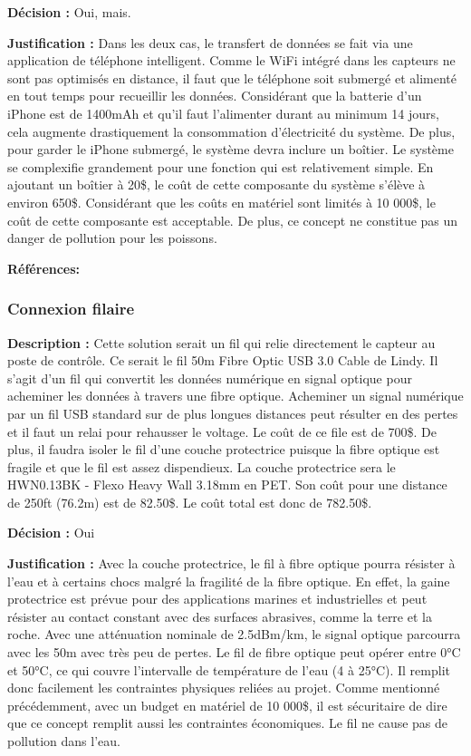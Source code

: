 \textbf{Décision :} Oui, mais.
 
\textbf{Justification :} Dans les deux cas, le transfert de données se fait via une application de téléphone intelligent. Comme le WiFi intégré dans les capteurs ne sont pas optimisés en distance, il faut que le téléphone soit submergé et alimenté en tout temps pour recueillir les données. Considérant que la batterie d'un iPhone est de 1400mAh et qu'il faut l'alimenter durant au minimum 14 jours, cela augmente drastiquement la consommation d'électricité du système. De plus, pour garder le iPhone submergé, le système devra inclure un boîtier. Le système se complexifie grandement pour une fonction qui est relativement simple. En ajoutant un boîtier à 20\$, le coût de cette composante du système s'élève à environ 650\$. Considérant que les coûts en matériel sont limités à 10 000\$, le coût de cette composante est acceptable. De plus, ce concept ne constitue pas un danger de pollution pour les poissons.

\textbf{Références:} \cite{GoPro_Specs} \cite{GoPro_Waterproof} \cite{GoFishCam} \cite{iPhone7}

\subsubsection{Connexion filaire}
\textbf{Description :} Cette solution serait un fil qui relie directement le capteur au poste de contrôle. Ce serait le fil 50m Fibre Optic USB 3.0 Cable de Lindy. Il s'agit d'un fil qui convertit les données numérique en signal optique pour acheminer les données à travers une fibre optique. Acheminer un signal numérique par un fil USB standard sur de plus longues distances peut résulter en des pertes et il faut un relai pour rehausser le voltage. Le coût de ce file est de 700\$. De plus, il faudra isoler le fil d'une couche protectrice puisque la fibre optique est fragile et que le fil est assez dispendieux. La couche protectrice sera le HWN0.13BK - Flexo Heavy Wall 3.18mm en PET. Son coût pour une distance de 250ft (76.2m) est de 82.50\$. Le coût total est donc de 782.50\$.
 
\textbf{Décision :} Oui
 
\textbf{Justification :} Avec la couche protectrice, le fil à fibre optique pourra résister à l'eau et à certains chocs malgré la fragilité de la fibre optique. En effet, la gaine protectrice est prévue pour des applications marines et industrielles et peut résister au contact constant avec des surfaces abrasives, comme la terre et la roche. Avec une atténuation nominale de 2.5dBm/km, le signal optique parcourra avec les 50m avec très peu de pertes. Le fil de fibre optique peut opérer entre 0°C et 50°C, ce qui couvre l'intervalle de température de l'eau (4 à 25°C). Il remplit donc facilement les contraintes physiques reliées au projet. Comme mentionné précédemment, avec un budget en matériel de 10 000\$, il est sécuritaire de dire que ce concept remplit aussi les contraintes économiques. Le fil ne cause pas de pollution dans l'eau.

